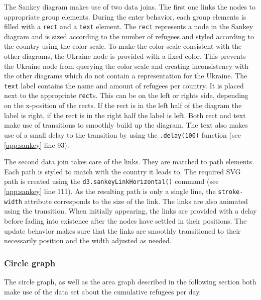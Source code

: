 The Sankey diagram makes use of two data joins. The first one links the nodes to appropriate group elements. During the enter behavior, each group elements is filled with a \texttt{rect} and a \texttt{text} element. The \texttt{rect} represents a node in the Sankey diagram and is sized according to the number of refugees and styled according to the country using the color scale. To make the color scale consistent with the other diagrams, the Ukraine node is provided with a fixed color. This prevents the Ukraine node from querying the color scale and creating inconsistency with the other diagrams which do not contain a representation for the Ukraine. The \texttt{text} label contains the name and amount of refugees per country. It is placed next to the appropriate \texttt{rect}s. This can be on the left or rights side, depending on the x-position of the rects. If the rect is in the left half of the diagram the label is right, if the rect is in the right half the label is left. Both rect and text make use of transitions to smoothly build up the diagram. The text also makes use of a small delay to the transition by using the \texttt{.delay(100)} function (see \ref{app:sankey} line 93).

The second data join takes care of the links. They are matched to path elements. Each path is styled to match with the country it leads to. The required SVG path is created using the \texttt{d3.sankeyLinkHorizontal()} command (see \ref{app:sankey} line 111). As the resulting path is only a single line, the \texttt{stroke-width} attribute corresponds to the size of the link. The links are also animated using the transition. When initially appearing, the links are provided with a delay before fading into existence after the nodes have settled in their positions. The update behavior makes sure that the links are smoothly transitioned to their necessarily position and the width adjusted as needed.

\subsubsection{Circle graph}
The circle graph, as well as the area graph described in the following section both make use of the data set about the cumulative refugees per day.


